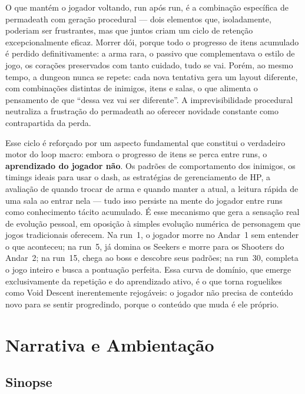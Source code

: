 \documentclass[12pt, a4paper]{article}
\begin{document}
O que mant\'em o jogador voltando, run ap\'os run, \'e a combina\c{c}\~ao espec\'ifica de permadeath com gera\c{c}\~ao procedural --- dois elementos que, isoladamente, poderiam ser frustrantes, mas que juntos criam um ciclo de reten\c{c}\~ao excepcionalmente eficaz. Morrer d\'oi, porque todo o progresso de itens acumulado \'e perdido definitivamente: a arma rara, o passivo que complementava o estilo de jogo, os cora\c{c}\~oes preservados com tanto cuidado, tudo se vai. Por\'em, ao mesmo tempo, a dungeon nunca se repete: cada nova tentativa gera um layout diferente, com combina\c{c}\~oes distintas de inimigos, itens e salas, o que alimenta o pensamento de que ``dessa vez vai ser diferente''. A imprevisibilidade procedural neutraliza a frustra\c{c}\~ao do permadeath ao oferecer novidade constante como contrapartida da perda.

Esse ciclo \'e refor\c{c}ado por um aspecto fundamental que constitui o verdadeiro motor do loop macro: embora o progresso de itens se perca entre runs, o \textbf{aprendizado do jogador n\~ao}. Os padr\~oes de comportamento dos inimigos, os timings ideais para usar o dash, as estrat\'egias de gerenciamento de HP, a avalia\c{c}\~ao de quando trocar de arma e quando manter a atual, a leitura r\'apida de uma sala ao entrar nela --- tudo isso persiste na mente do jogador entre runs como conhecimento t\'acito acumulado. \'E esse mecanismo que gera a sensa\c{c}\~ao real de evolu\c{c}\~ao pessoal, em oposi\c{c}\~ao \`a simples evolu\c{c}\~ao num\'erica de personagem que jogos tradicionais oferecem. Na run~1, o jogador morre no Andar~1 sem entender o que aconteceu; na run~5, j\'a domina os Seekers e morre para os Shooters do Andar~2; na run~15, chega ao boss e descobre seus padr\~oes; na run~30, completa o jogo inteiro e busca a pontua\c{c}\~ao perfeita. Essa curva de dom\'inio, que emerge exclusivamente da repeti\c{c}\~ao e do aprendizado ativo, \'e o que torna roguelikes como Void Descent inerentemente rejog\'aveis: o jogador n\~ao precisa de conte\'udo novo para se sentir progredindo, porque o conte\'udo que muda \'e ele pr\'oprio.

\section{Narrativa e Ambienta\c{c}\~ao}

\subsection{Sinopse}
\end{document}
